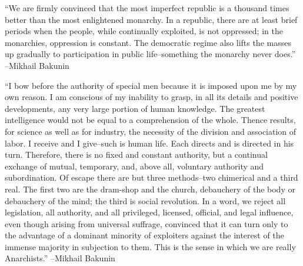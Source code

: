 \documentclass{article}%
\begin{document}
\linebreak%
\vspace{1mm}%
\begin{minipage}{\textwidth}%
\flushleft%
“We are firmly convinced that the most imperfect republic is a thousand times better than the most enlightened monarchy. In a republic, there are at least brief periods when the people, while continually exploited, is not oppressed; in the monarchies, oppression is constant. The democratic regime also lifts the masses up gradually to participation in public life–something the monarchy never does.”%
\linebreak%
\vspace{1mm}%
–Mikhail Bakunin%
\linebreak%
\vspace{1mm}%
\end{minipage}%
\linebreak%
\vspace{1mm}%
\begin{minipage}{\textwidth}%
\flushleft%
“I bow before the authority of special men because it is imposed upon me by my own reason. I am conscious of my inability to grasp, in all its details and positive developments, any very large portion of human knowledge. The greatest intelligence would not be equal to a comprehension of the whole. Thence results, for science as well as for industry, the necessity of the division and association of labor. I receive and I give–such is human life. Each directs and is directed in his turn. Therefore, there is no fixed and constant authority, but a continual exchange of mutual, temporary, and, above all, voluntary authority and subordination. Of escape there are but three methods–two chimerical and a third real. The first two are the dram{-}shop and the church, debauchery of the body or debauchery of the mind; the third is social revolution. In a word, we reject all legislation, all authority, and all  privileged, licensed, official, and legal influence, even though arising from universal suffrage, convinced that it can turn only to the advantage of a dominant minority of exploiters against the interest of the immense majority in subjection to them.  This is the sense in which we are really Anarchists.”%
\linebreak%
\vspace{1mm}%
–Mikhail Bakunin%
\linebreak%
\vspace{1mm}%
\end{minipage}%
\linebreak%
\end{document}
